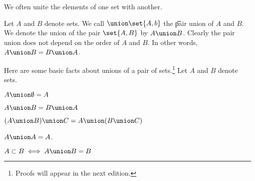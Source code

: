 

We often unite the elements of one set with another.


Let $A$ and $B$ denote sets.
We call $\union \set{A, b}$ the \t{pair union} of $A$ and $B$.
We denote the union of the pair $\set{A, B}$ by $A \union B$.
Clearly the pair union does not depend on the order of $A$ and $B$.
In other words, $A \union B = B \union A$.


Here are some basic facts about unions of a pair of sets.\footnote{Proofs will appear in the next edition.}
Let $A$ and $B$ denote sets.

\begin{proposition}
  $A \union \emptyset = A$
  \label{pair_unions:identity_element}
\end{proposition}

\begin{proposition}[Commutativity]
  $A \union B = B \union A$
\end{proposition}

\begin{proposition}[Associativity]
  $(A \union B) \union C = A \union (B \union C)$
\end{proposition}

\begin{proposition}[Idempotence]
  $A \union A = A$.
\end{proposition}

\begin{proposition}
  $A \subset B \iff A \union B = B$
\end{proposition}

\blankpage

